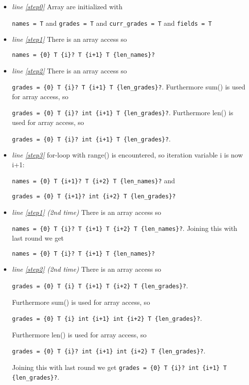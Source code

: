 \documentclass[11pt]{article}
\begin{document}
\begin{itemize}

\item \textit{line \ref{step0}} Array are initialized with 

\verb|names = T| and \verb|grades = T| and \verb|curr_grades = T| and \verb|fields = T|

\item \textit{line \ref{step1}} There is an array access so 

\verb|names = {0} T {i}? T {i+1} T {len_names}?|

\item \textit{line \ref{step2}} There is an array access so 

\verb|grades = {0} T {i}? T {i+1} T {len_grades}?|. Furthermore sum() is used for array access, so 

\verb|grades = {0} T {i}? int {i+1} T {len_grades}?|. Furthermore len() is used for array access, so 

\verb|grades = {0} T {i}? int {i+1} T {len_grades}?|. 

\item \textit{line \ref{step3}} for-loop with range() is encountered, so iteration variable i is now i+1: 

\verb|names = {0} T {i+1}? T {i+2} T {len_names}?| and 

\verb|grades = {0} T {i+1}? int {i+2} T {len_grades}?|

\item \textit{line \ref{step1} (2nd time)} There is an array access so 

\verb|names = {0} T {i}? T {i+1} T {i+2} T {len_names}?|. Joining this with last round we get 

\verb|names = {0} T {i}? T {i+1} T {len_names}?|

\item \textit{line \ref{step2} (2nd time)} There is an array access so 

\verb|grades = {0} T {i} T {i+1} T {i+2} T {len_grades}?|. 

Furthermore sum() is used for array access, so 

\verb|grades = {0} T {i} int {i+1} int {i+2} T {len_grades}?|. 

Furthermore len() is used for array access, so 

\verb|grades = {0} T {i}? int {i+1} int {i+2} T {len_grades}?|.

Joining this with last round we get \verb|grades = {0} T {i}? int {i+1} T {len_grades}?|.


\end{itemize}
\end{document}
